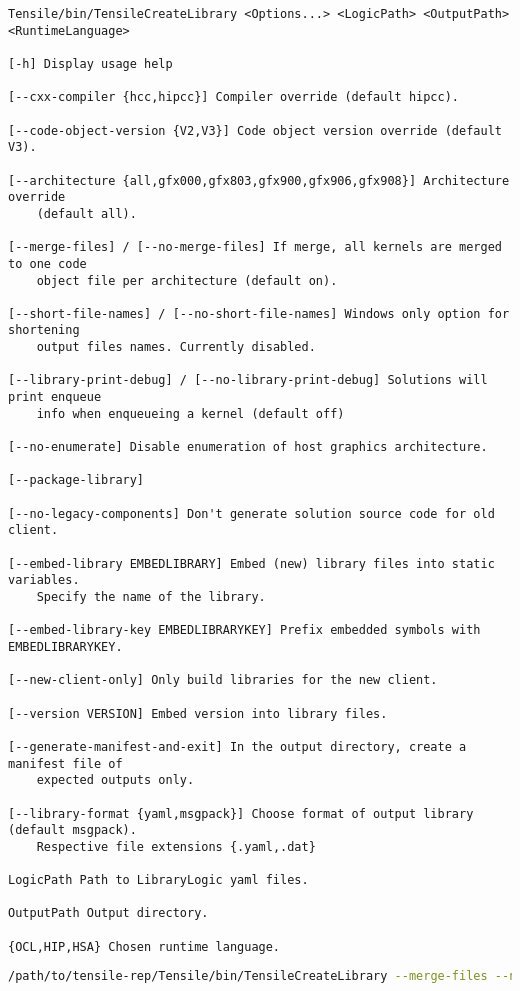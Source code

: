\documentclass[]{article}
\begin{document}
\begin{verbatim}
Tensile/bin/TensileCreateLibrary <Options...> <LogicPath> <OutputPath> <RuntimeLanguage>

[-h] Display usage help

[--cxx-compiler {hcc,hipcc}] Compiler override (default hipcc).

[--code-object-version {V2,V3}] Code object version override (default V3).

[--architecture {all,gfx000,gfx803,gfx900,gfx906,gfx908}] Architecture override
    (default all).

[--merge-files] / [--no-merge-files] If merge, all kernels are merged to one code
    object file per architecture (default on).

[--short-file-names] / [--no-short-file-names] Windows only option for shortening
    output files names. Currently disabled.

[--library-print-debug] / [--no-library-print-debug] Solutions will print enqueue
    info when enqueueing a kernel (default off)

[--no-enumerate] Disable enumeration of host graphics architecture.

[--package-library]

[--no-legacy-components] Don't generate solution source code for old client.

[--embed-library EMBEDLIBRARY] Embed (new) library files into static variables.
    Specify the name of the library.

[--embed-library-key EMBEDLIBRARYKEY] Prefix embedded symbols with EMBEDLIBRARYKEY.

[--new-client-only] Only build libraries for the new client.

[--version VERSION] Embed version into library files.

[--generate-manifest-and-exit] In the output directory, create a manifest file of
    expected outputs only.

[--library-format {yaml,msgpack}] Choose format of output library (default msgpack).
    Respective file extensions {.yaml,.dat}

LogicPath Path to LibraryLogic yaml files.

OutputPath Output directory.

{OCL,HIP,HSA} Chosen runtime language.
\end{verbatim}

\begin{lstlisting}[language=bash]
/path/to/tensile-rep/Tensile/bin/TensileCreateLibrary --merge-files --no-legacy-components --no-short-file-names --no-library-print-debug --code-object-version=V3 --cxx-compiler=hipcc --library-format=msgpack path/to/new/logic path/to/drop/new/tensile HIP
\end{lstlisting}
\end{document}
